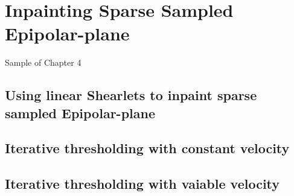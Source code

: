 \chapter{Inpainting Sparse Sampled Epipolar-plane}
\label{chap:Inpainting_sparse}
Sample of Chapter 4

\section{Using linear Shearlets to inpaint sparse sampled Epipolar-plane}

\section{Iterative thresholding with constant velocity}

\section{Iterative thresholding with vaiable velocity}



